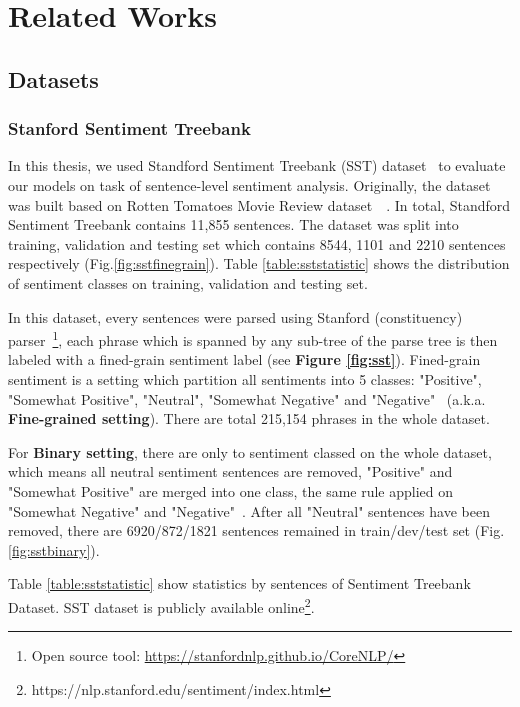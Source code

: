 \hypertarget{chap:related}{\chapter{Related Works}}
\label{chap:related-work}
\section{Datasets}\label{sec:dataset}
\subsection{Stanford Sentiment Treebank} \label{sec:sst}
In this thesis, we used Standford Sentiment Treebank (SST) dataset~\cite{socher2013recursive} to evaluate our models on task of sentence-level sentiment analysis. 
Originally, the dataset was built based on Rotten Tomatoes Movie Review dataset~\cite{Rotten-Tomato}~\cite{socher2013recursive}. 
In total, Standford Sentiment Treebank contains 11,855 sentences. 
The dataset was split into training, validation and testing set which contains 8544, 1101 and 2210 sentences respectively (Fig.\ref{fig:sstfinegrain}).
Table \ref{table:sststatistic} shows the distribution of sentiment classes on training, validation and testing set. 

In this dataset, every sentences were parsed using Stanford (constituency) parser~\cite{socher2013recursive}\footnote{Open source tool: \url{https://stanfordnlp.github.io/CoreNLP/}}, each phrase which is spanned by any sub-tree of the parse tree is then labeled with  a fined-grain sentiment label (see \textbf{Figure \ref{fig:sst}}). 
Fined-grain sentiment is a setting which partition all sentiments into 5 classes: "Positive", "Somewhat Positive", "Neutral", "Somewhat Negative" and "Negative"~\cite{socher2013recursive} (a.k.a. \textbf{Fine-grained setting}).
There are total 215,154 phrases in the whole dataset. 

For \textbf{Binary setting}, there are only to sentiment classed on the whole dataset, which means all neutral sentiment sentences are removed, "Positive" and "Somewhat Positive" are merged into one class, the same rule applied on "Somewhat Negative" and "Negative"~\cite{socher2013recursive}.   
After all "Neutral" sentences have been removed, there are 6920/872/1821 sentences remained in train/dev/test set (Fig. \ref{fig:sstbinary}).


Table \ref{table:sststatistic} show statistics by sentences of Sentiment Treebank Dataset.
SST dataset is publicly available online\footnote{https://nlp.stanford.edu/sentiment/index.html}. 

